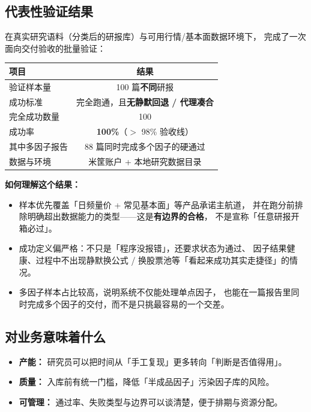 \documentclass[UTF8,a4paper,11pt]{ctexart}
\begin{document}
\subsection{代表性验证结果}

在真实研究语料（分类后的研报库）与可用行情/基本面数据环境下，
完成了一次面向交付验收的批量验证：

\begin{table}[h]
\centering
\renewcommand{\arraystretch}{1.25}
\begin{tabular}{@{}lc@{}}
\toprule
\textbf{项目} & \textbf{结果} \\
\midrule
验证样本量 & 100 篇\textbf{不同}研报 \\
成功标准 & 完全跑通，且\textbf{无静默回退 / 代理凑合} \\
完全成功数量 & 100 \\
成功率 & \textbf{100\%}（$>$ 98\% 验收线） \\
其中多因子报告 & 88 篇同时完成多个因子的硬通过 \\
数据与环境 & 米筐账户 + 本地研究数据目录 \\
\bottomrule
\end{tabular}
\end{table}

\textbf{如何理解这个结果：}

\begin{itemize}
  \item 样本优先覆盖「日频量价 + 常见基本面」等产品承诺主航道，
        并在跑分前排除明确超出数据能力的类型——这是\textbf{有边界的合格}，
        不是宣称「任意研报开箱必过」。
  \item 成功定义偏严格：不只是「程序没报错」，还要求状态为通过、
        因子结果健康、过程中不出现静默换公式 / 换股票池等「看起来成功其实走捷径」的情况。
  \item 多因子样本占比较高，说明系统不仅能处理单点因子，
        也能在一篇报告里同时完成多个因子的交付，而不是只挑最容易的一个交差。
\end{itemize}

\subsection{对业务意味着什么}

\begin{itemize}
  \item \textbf{产能：} 研究员可以把时间从「手工复现」更多转向「判断是否值得用」。
  \item \textbf{质量：} 入库前有统一门槛，降低「半成品因子」污染因子库的风险。
  \item \textbf{可管理：} 通过率、失败类型与边界可以谈清楚，便于排期与资源分配。
\end{itemize}
\end{document}
